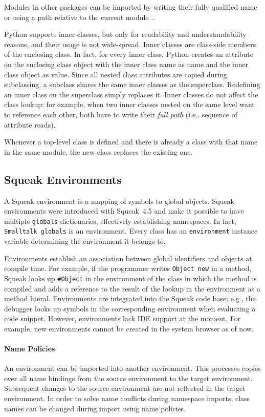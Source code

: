 Modules in other packages can be imported by writing their fully qualified name or using a path relative to the current module~\cite{pythonp1}.

Python supports inner classes, but only for readability and understandability reasons, and their usage is not wide-spread. Inner classes are class-side members of the enclosing class. In fact, for every inner class, Python creates an attribute on the enclosing class object with the inner class name as name and the inner class object as value. Since all nested class attributes are copied during subclassing, a subclass shares the same inner classes as the superclass. Redefining an inner class on the superclass simply replaces it. Inner classes do not affect the class lookup: for example, when two inner classes nested on the same level want to reference each other, both have to write their \emph{full path} (i.e., sequence of attribute reads).

Whenever a top-level class is defined and there is already a class with that name in the same module, the new class replaces the existing one.

\subsection{Squeak Environments}
\label{sec:rel_sq_env}
A Squeak environment is a mapping of symbols to global objects. Squeak environments were introduced with Squeak~4.5\cite{squeak45notes} and make it possible to have multiple \texttt{globals} dictionaries, effectively establishing namespaces. In fact, \texttt{Smalltalk globals} is an environment. Every class has an \texttt{environment} instance variable determining the environment it belongs to.

Environments establish an association between global identifiers and objects at compile time. For example, if the programmer writes \texttt{Object new} in a method, Squeak looks up \texttt{\#Object} in the environment of the class in which the method is compiled and adds a reference to the result of the lookup in the environment as a method literal. Environments are integrated into the Squeak code base; e.g., the debugger looks up symbols in the corresponding environment when evaluating a code snippet. However, environments lack IDE support at the moment. For example, new environments cannot be created in the system browser as of now.

\paragraph{Name Policies}
An environment can be imported into another environment. This processes copies over all name bindings from the source environment to the target environment. Subsequent changes to the source environment are not reflected in the target environment. In order to solve name conflicts during namespace imports, class names can be changed during import using name policies.

